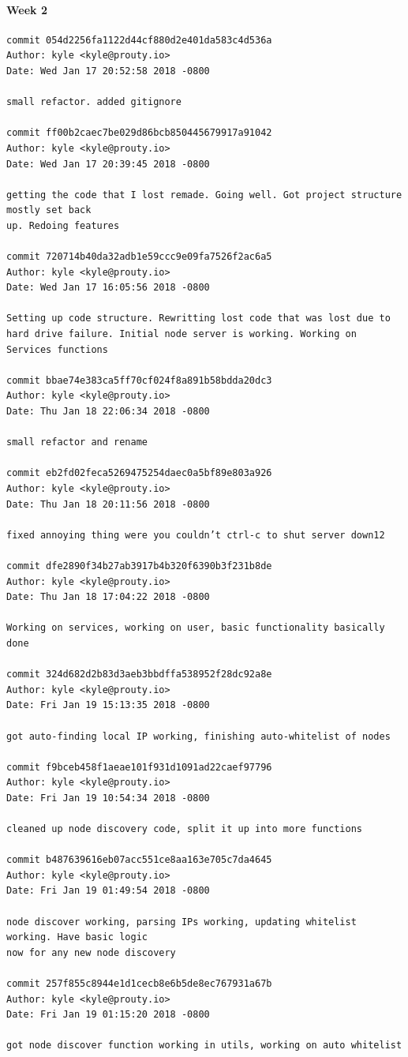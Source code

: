 \documentclass[draftclsnofoot, onecolumn, compsoc, 10pt]{IEEEtran}
\begin{document}
\paragraph{Week 2}
\begin{lstlisting}
commit 054d2256fa1122d44cf880d2e401da583c4d536a 
Author: kyle <kyle@prouty.io> 
Date: Wed Jan 17 20:52:58 2018 -0800 

small refactor. added gitignore 

commit ff00b2caec7be029d86bcb850445679917a91042 
Author: kyle <kyle@prouty.io> 
Date: Wed Jan 17 20:39:45 2018 -0800 

getting the code that I lost remade. Going well. Got project structure mostly set back 
up. Redoing features 

commit 720714b40da32adb1e59ccc9e09fa7526f2ac6a5 
Author: kyle <kyle@prouty.io> 
Date: Wed Jan 17 16:05:56 2018 -0800 

Setting up code structure. Rewritting lost code that was lost due to hard drive failure. Initial node server is working. Working on Services functions 

commit bbae74e383ca5ff70cf024f8a891b58bdda20dc3 
Author: kyle <kyle@prouty.io> 
Date: Thu Jan 18 22:06:34 2018 -0800 

small refactor and rename 

commit eb2fd02feca5269475254daec0a5bf89e803a926 
Author: kyle <kyle@prouty.io> 
Date: Thu Jan 18 20:11:56 2018 -0800 

fixed annoying thing were you couldn’t ctrl-c to shut server down12 

commit dfe2890f34b27ab3917b4b320f6390b3f231b8de 
Author: kyle <kyle@prouty.io> 
Date: Thu Jan 18 17:04:22 2018 -0800 

Working on services, working on user, basic functionality basically done 

commit 324d682d2b83d3aeb3bbdffa538952f28dc92a8e 
Author: kyle <kyle@prouty.io> 
Date: Fri Jan 19 15:13:35 2018 -0800 

got auto-finding local IP working, finishing auto-whitelist of nodes 

commit f9bceb458f1aeae101f931d1091ad22caef97796 
Author: kyle <kyle@prouty.io> 
Date: Fri Jan 19 10:54:34 2018 -0800 

cleaned up node discovery code, split it up into more functions 

commit b487639616eb07acc551ce8aa163e705c7da4645 
Author: kyle <kyle@prouty.io> 
Date: Fri Jan 19 01:49:54 2018 -0800 

node discover working, parsing IPs working, updating whitelist working. Have basic logic 
now for any new node discovery 

commit 257f855c8944e1d1cecb8e6b5de8ec767931a67b 
Author: kyle <kyle@prouty.io> 
Date: Fri Jan 19 01:15:20 2018 -0800 

got node discover function working in utils, working on auto whitelist 
\end{lstlisting}
\end{document}
